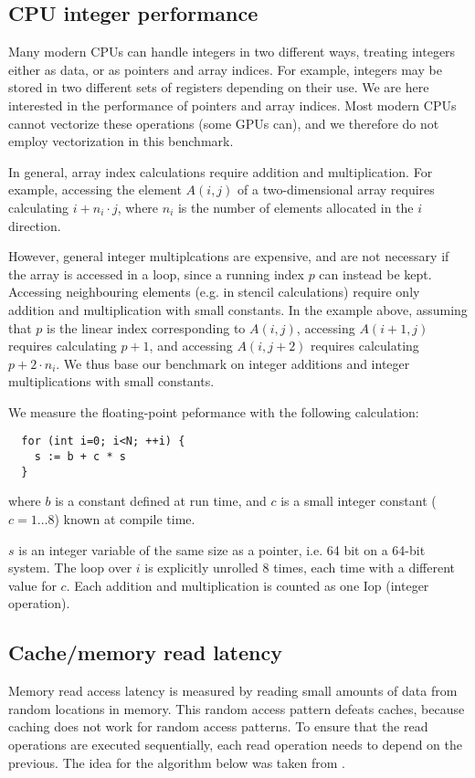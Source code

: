 \subsection{CPU integer performance}

Many modern CPUs can handle integers in two different ways, treating
integers either as data, or as pointers and array indices. For
example, integers may be stored in two different sets of registers
depending on their use. We are here interested in the performance of
pointers and array indices. Most modern CPUs cannot vectorize these
operations (some GPUs can), and we therefore do not employ
vectorization in this benchmark.

In general, array index calculations require addition and
multiplication. For example, accessing the element $A(i,j)$ of a
two-dimensional array requires calculating $i + n_i \cdot j$, where
$n_i$ is the number of elements allocated in the $i$ direction.

However, general integer multiplcations are expensive, and are not
necessary if the array is accessed in a loop, since a running index
$p$ can instead be kept. Accessing neighbouring elements (e.g. in
stencil calculations) require only addition and multiplication with
small constants. In the example above, assuming that $p$ is the linear
index corresponding to $A(i,j)$, accessing $A(i+1,j)$ requires
calculating $p+1$, and accessing $A(i,j+2)$ requires calculating $p +
2 \cdot n_i$. We thus base our benchmark on integer additions and
integer multiplications with small constants.

We measure the floating-point peformance with the following
calculation:
\begin{verbatim}
  for (int i=0; i<N; ++i) {
    s := b + c * s
  }
\end{verbatim}
where $b$ is a constant defined at run time, and $c$ is a small
integer constant ($c = 1 \ldots 8$) known at compile time.

$s$ is an integer variable of the same size as a pointer, i.e. 64 bit
on a 64-bit system. The loop over $i$ is explicitly unrolled $8$
times, each time with a different value for $c$. Each addition and
multiplication is counted as one Iop (integer operation).

\subsection{Cache/memory read latency}

Memory read access latency is measured by reading small amounts of
data from random locations in memory. This random access pattern
defeats caches, because caching does not work for random access
patterns. To ensure that the read operations are executed
sequentially, each read operation needs to depend on the previous. The
idea for the algorithm below was taken from \cite{lmbench-usenix}.

